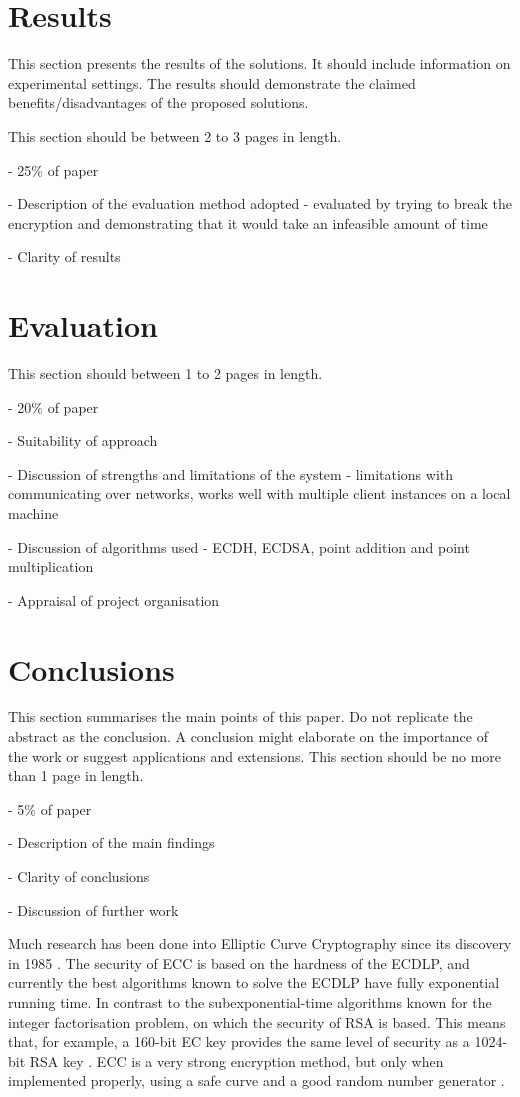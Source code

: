 \documentclass[12pt,a4paper]{article}
\begin{document}
\section{Results}
This section presents the results of the solutions. 
It should include information on experimental settings. 
The results should demonstrate the claimed benefits/disadvantages of the proposed solutions.

This section should be between 2 to 3 pages in length.

- 25\% of paper

- Description of the evaluation method adopted - evaluated by trying to break the encryption and demonstrating that it would take an infeasible amount of time

- Clarity of results


\section{Evaluation}
This section should between 1 to 2 pages in length.

- 20\% of paper

- Suitability of approach

- Discussion of strengths and limitations of the system - limitations with communicating over networks, works well with multiple client instances on a local machine

- Discussion of algorithms used - ECDH, ECDSA, point addition and point multiplication

- Appraisal of project organisation


\section{Conclusions}
This section summarises the main points of this paper. 
Do not replicate the abstract as the conclusion. 
A conclusion might elaborate on the importance of the work or suggest applications and extensions. 
This section should be no more than 1 page in length. 

- 5\% of paper

- Description of the main findings

- Clarity of conclusions

- Discussion of further work

Much research has been done into Elliptic Curve Cryptography since its discovery in 1985 \cite{10.1007/3-540-39799-X_31,koblitz1987elliptic}. 
The security of ECC is based on the hardness of the ECDLP, 
and currently the best algorithms known to solve the ECDLP have fully exponential running time. 
In contrast to the subexponential-time algorithms known for the integer factorisation problem, 
on which the security of RSA is based. 
This means that, for example, a 160-bit EC key provides the same level of security as a 1024-bit RSA key \cite{hankerson2003guide,silverman2009arithmetic}. 
ECC is a very strong encryption method, but only when implemented properly, 
using a safe curve \cite{bernstein2013safecurves,10.1007/11745853_14}
and a good random number generator \cite{hotz2010console}. 



\end{document}
